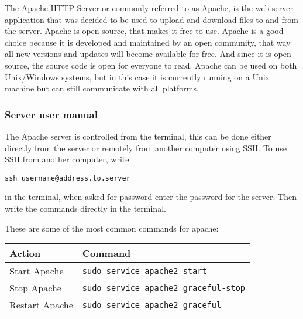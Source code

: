 The Apache HTTP Server or commonly referred to as Apache, is the web server application that was decided to be used to upload and download files to and from the server. Apache is open source, that makes it free to use. Apache is a good choice because it is developed and maintained by an open community, that way all new versions and updates will become available for free. And since it is open source, the source code is open for everyone to read. Apache can be used on both Unix/Windows systems, but in this case it is currently running on a Unix machine but can still communicate with all platforms. 

\subsubsection{Server user manual}
The Apache server is controlled from the terminal, this can be done either directly from the server or remotely from another computer using SSH. To use SSH from another computer, write

\texttt{ssh username@address.to.server}

in the terminal, when asked for password enter the password for the server. Then write the commands directly in the terminal.

These are some of the most common commands for apache: \\
\begin{tabular} {| l | l |}
\hline
\textbf{Action} & \textbf{Command} \\
\hline
Start Apache & \texttt{sudo service apache2 start} \\
\hline
Stop Apache & \texttt{sudo service apache2 graceful-stop} \\
\hline
Restart Apache & \texttt{sudo service apache2 graceful} \\
\hline
\end{tabular}